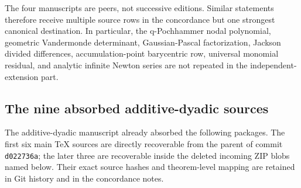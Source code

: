 The four manuscripts are peers, not successive editions.  Similar statements
therefore receive multiple source rows in the concordance but one strongest
canonical destination.  In particular, the q-Pochhammer nodal polynomial,
geometric Vandermonde determinant, Gaussian-Pascal factorization, Jackson
divided differences, accumulation-point barycentric row, universal monomial
residual, and analytic infinite Newton series are not repeated in the
independent-extension part.

\subsection{The nine absorbed additive-dyadic sources}

The additive-dyadic manuscript already absorbed the following packages.  The
first six main TeX sources are directly recoverable from the parent of commit
\texttt{d022736a}; the later three are recoverable inside the deleted incoming
ZIP blobs named below.  Their exact source hashes and theorem-level mapping are
retained in Git history and in the concordance notes.

